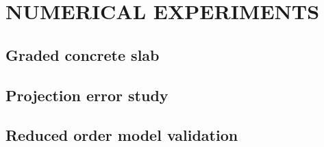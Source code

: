 \documentclass[a4paper]{eccomas_paper-2024}
\begin{document}

\section{NUMERICAL EXPERIMENTS} %
\label{sec:numerical experiments}


\subsection{Graded concrete slab} %
\label{sub:Graded concrete slab}

%
%
%

\subsection{Projection error study} %
\label{sub:Projection error study}


\subsection{Reduced order model validation} %
\label{sub:Reduced order model validation}
\end{document}
